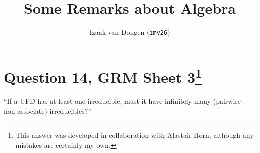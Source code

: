 \documentclass[fleqn,a4paper,11pt]{article}
\title{Some Remarks about Algebra}
\author{\texorpdfstring{Izaak van Dongen (\texttt{imv26})}
                       {Izaak van Dongen (imv26)}}
\begin{document}
\maketitle

\section[Question 14, GRM Sheet 3]{Question 14, GRM Sheet 3\footnote{%
 This answer was developed in collaboration with Alastair Horn, although any
 mistakes are certainly my own.}}

\begin{tcolorbox}
 ``If a UFD has at least one irreducible, must it have infinitely many (pairwise
 non-associate) irreducibles?''
\end{tcolorbox}

\end{document}
